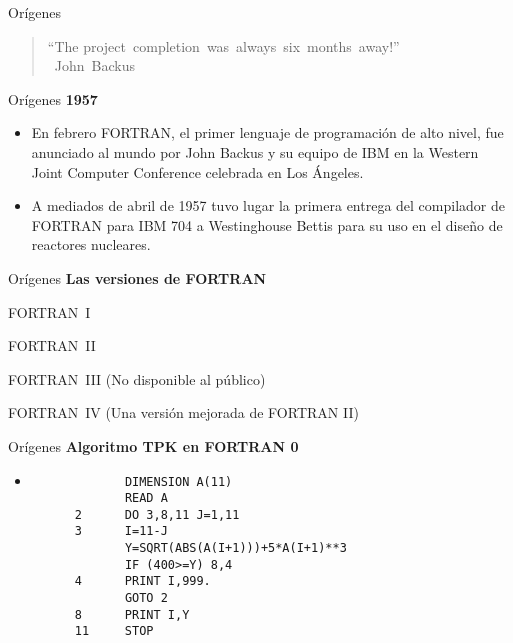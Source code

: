 \begin{frame}[fragile]{Orígenes}
  \begin{quote}
    ``The project completion was always six months away!''\\
     John Backus
  \end{quote}
\end{frame}


\begin{frame}[fragile]{Orígenes}
  \textbf{1957}
  \begin{itemize}[<+(1)->]
    \item[] En febrero FORTRAN, el primer lenguaje de programación de alto nivel, fue anunciado al mundo por John Backus y su equipo de IBM en la Western Joint Computer Conference celebrada en Los Ángeles.
    \item[] A mediados de abril de 1957 tuvo lugar la primera entrega del compilador de FORTRAN para IBM 704 a Westinghouse Bettis para su uso en el diseño de reactores nucleares.
  \end{itemize}
\end{frame}


\begin{frame}[fragile]{Orígenes}
  \textbf{Las versiones de FORTRAN}
  \begin{description}[<+(1)->]
    \item[1957] FORTRAN I
    \item[1958] FORTRAN II
    \item[1958] FORTRAN III (No disponible al público)
    \item[1961] FORTRAN IV (Una versión mejorada de FORTRAN II)
      \end{description}
\end{frame}


\begin{frame}[fragile]{Orígenes}
    \textbf{Algoritmo TPK en FORTRAN 0}
    \begin{itemize}
    \item []
     \begin{verbatim}
             DIMENSION A(11)
             READ A
      2      DO 3,8,11 J=1,11
      3      I=11-J
             Y=SQRT(ABS(A(I+1)))+5*A(I+1)**3
             IF (400>=Y) 8,4
      4      PRINT I,999.
             GOTO 2
      8      PRINT I,Y
      11     STOP
     \end{verbatim}
    \end{itemize}
\end{frame}


